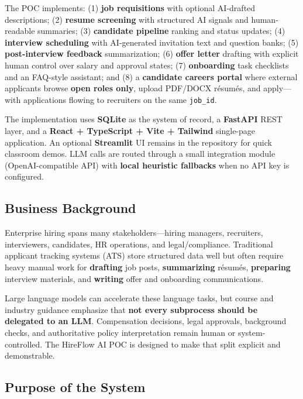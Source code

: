 \documentclass[12pt]{article}
\begin{document}
The POC implements: (1) \textbf{job requisitions} with optional AI-drafted descriptions; (2) \textbf{resume screening} with structured AI signals and human-readable summaries; (3) \textbf{candidate pipeline} ranking and status updates; (4) \textbf{interview scheduling} with AI-generated invitation text and question banks; (5) \textbf{post-interview feedback} summarization; (6) \textbf{offer letter} drafting with explicit human control over salary and approval states; (7) \textbf{onboarding} task checklists and an FAQ-style assistant; and (8) a \textbf{candidate careers portal} where external applicants browse \textbf{open roles only}, upload PDF/DOCX résumés, and apply---with applications flowing to recruiters on the same \texttt{job\_id}.

The implementation uses \textbf{SQLite} as the system of record, a \textbf{FastAPI} REST layer, and a \textbf{React + TypeScript + Vite + Tailwind} single-page application. An optional \textbf{Streamlit} UI remains in the repository for quick classroom demos. LLM calls are routed through a small integration module (OpenAI-compatible API) with \textbf{local heuristic fallbacks} when no API key is configured.

\subsection{Business Background}

Enterprise hiring spans many stakeholders---hiring managers, recruiters, interviewers, candidates, HR operations, and legal/compliance. Traditional applicant tracking systems (ATS) store structured data well but often require heavy manual work for \textbf{drafting} job posts, \textbf{summarizing} résumés, \textbf{preparing} interview materials, and \textbf{writing} offer and onboarding communications.

Large language models can accelerate these language tasks, but course and industry guidance emphasize that \textbf{not every subprocess should be delegated to an LLM}. Compensation decisions, legal approvals, background checks, and authoritative policy interpretation remain human or system-controlled. The HireFlow AI POC is designed to make that split explicit and demonstrable.

\subsection{Purpose of the System}
\end{document}
